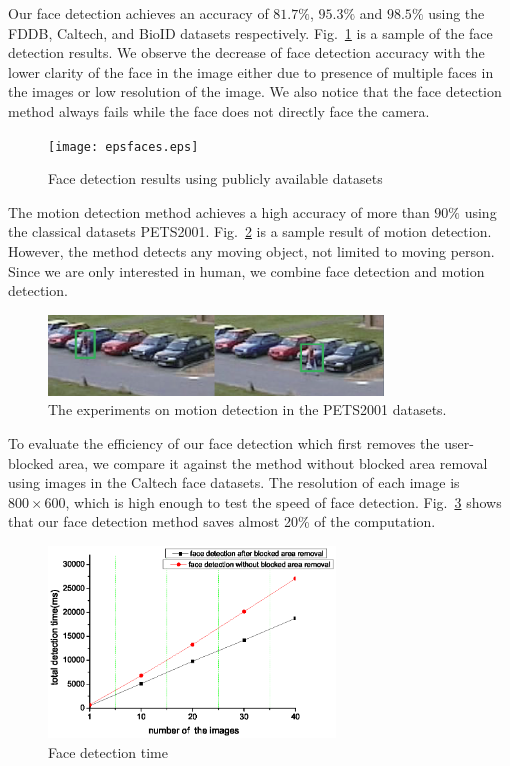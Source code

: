 Our face detection achieves an accuracy of $81.7\%$, $95.3\%$ and $98.5\%$  using the FDDB, Caltech, and  BioID datasets respectively. Fig.~\ref{fig:face-results} is a sample of the face detection results. We observe the decrease of face detection accuracy with the lower clarity of the face in the image either due to presence of multiple faces in the images or low resolution of the image. We also notice that the face detection method always fails while the face does not directly face the camera.
\begin{figure}[H]
\centering
\texttt{[image: epsfaces.eps]}
\caption{Face detection results using publicly available datasets}
\label{fig:face-results}
\end{figure}

 The motion detection method achieves a high accuracy of more than $90\%$ using the classical datasets PETS2001. Fig.~\ref{fig:motion-results} is a sample result of motion detection. However, the method detects any moving object, not limited to moving person.  Since we are only interested in human, we combine  face detection  and motion detection.
 \begin{figure}[H]
\centering
\includegraphics[width=3.5in]{epsmotionret.eps}
\caption{The experiments on motion detection in the PETS2001 datasets. }
\label{fig:motion-results}
\end{figure}


To evaluate the efficiency of our face detection which first removes the user-blocked area, we compare it against the method without blocked area removal  using images in the Caltech face datasets. The resolution of each image is $800\times600$, which is high enough to test the speed of face detection.  Fig.~\ref{fig:blocked-results} shows that our face detection method saves almost 20\% of the computation.
 \begin{figure}[H]
\centering
\includegraphics[width=3in]{epsfaceremoval.eps}
\caption{Face detection time}
\label{fig:blocked-results}
\end{figure}


